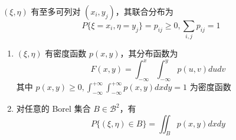 \documentclass[12pt,a4paper]{amsart}
\begin{document}
\begin{definition}[离散型联合分布]
    $(\xi, \eta)$ 有至多可列对 $(x_i, y_j)$，其联合分布为
    \begin{equation}
        P\{\xi=x_i, \eta=y_j\} = p_{ij} \geq 0, \sum_{i,j}p_{ij} = 1
    \end{equation}
\end{definition}

\begin{definition}[连续型联合分布]
    \begin{enumerate}
        \item $(\xi, \eta)$ 有密度函数 $p(x, y)$，其分布函数为
        \begin{equation}
            F(x,y) = \int_{-\infty}^{x}\int_{-\infty}^{y}p(u, v)dudv
        \end{equation}
        其中 $p(x, y) \geq 0, \int_{-\infty}^{+\infty}\int_{-\infty}^{+\infty}p(x, y)dxdy = 1$ 为密度函数
        \item 对任意的 Borel 集合 $B\in\mathcal{B}^2$，有
        \begin{equation}
            P\{(\xi, \eta)\in B\} = \iint_Bp(x, y)dxdy
        \end{equation}
    \end{enumerate}
\end{definition}

\begin{definition}[边缘分布]
    
\end{definition}

\appendix



{\footnotesize}
\end{document}
